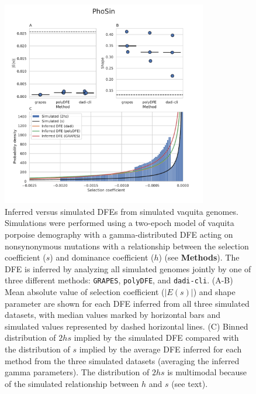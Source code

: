 \documentclass[hidelinks]{article}
\newcommand{\polydfe}{\texttt{polyDFE}\xspace}
\newcommand{\dadicli}{\texttt{dadi-cli}\xspace}
\newcommand{\grapes}{\texttt{GRAPES}\xspace}
\begin{document}
    \begin{figure}[b!]
        \centering
        \includegraphics[width=0.8\textwidth]{figures/PhoSin/Vaquita2Epoch_1R22/PhoSin_Vaquita2Epoch_1R22_Gamma_R22_Phocoena_sinus.mPhoSin1.pri.110_exons_DFE_plot.pdf}
        \caption{
        \label{fig:vaquita-dfe}
        Inferred versus simulated DFEs from simulated vaquita genomes.
        Simulations were performed using a two-epoch model of vaquita porpoise demography with a gamma-distributed DFE
        acting on nonsynonymous mutations with a relationship between the selection coefficient ($s$) and dominance coefficient ($h$) (see \textbf{Methods}).
        The DFE is inferred by analyzing all simulated genomes jointly by one of three different methods:
        \grapes, \polydfe, and \dadicli.
        (A-B) Mean absolute value of selection coefficient ($\lvert E(s) \rvert $) and shape parameter are
        shown for each DFE inferred from all three simulated datasets,
        with median values marked by horizontal bars
        and simulated values represented by dashed horizontal lines.
        (C) Binned distribution of $2hs$ implied by the simulated DFE compared with
        the distribution of $s$ implied by the average DFE inferred for each method from the three simulated datasets (averaging the inferred gamma parameters).
        The distribution of $2 h s$ is multimodal because of the simulated relationship between $h$ and $s$ (see text).
        }
    \end{figure}
\end{document}
